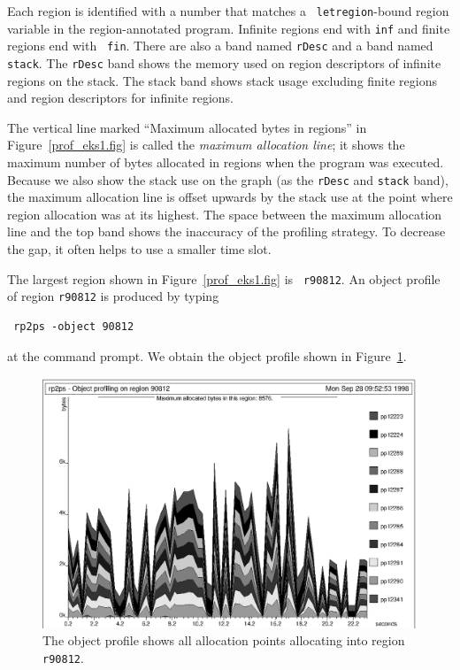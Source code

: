 \documentclass[12pt]{book}
\begin{document}
Each region is identified with a number that matches a {\tt
  letregion}-bound region variable in the region-annotated program.
Infinite regions end with {\tt inf} and finite regions end with {\tt
  fin}. There are also a band named {\tt rDesc} and a band named
{\tt stack}. The {\tt rDesc} band shows the memory used on
region descriptors of infinite regions on the stack. The stack band
shows stack usage excluding finite regions and region descriptors for
infinite regions.

The vertical line marked ``Maximum allocated bytes in regions'' in
Figure~\ref{prof_eks1.fig} is called the {\em maximum allocation
  line}; it shows the maximum number of bytes allocated in regions
when the program was executed. Because we also show the stack use on
the graph (as the {\tt rDesc} and {\tt stack} band), the maximum
allocation line is offset upwards by the stack use at the point where
region allocation was at its highest. The space between the maximum
allocation line and the top band shows the inaccuracy of the profiling
strategy. To decrease the gap, it often helps to use a smaller time
slot.

The largest region shown in Figure~\ref{prof_eks1.fig} is {\tt
  r90812}. An
%
%
object profile of region {\tt r90812} is produced by typing
\begin{verbatim}
 rp2ps -object 90812
\end{verbatim}
at the command prompt. We obtain the object profile shown in
Figure~\ref{prof_eks2.fig}.
\begin{figure}
\begin{center}
\includegraphics{prof_eks2.ps}
\end{center}
\caption{The object profile shows all allocation points allocating into region {\tt r90812}.}
\label{prof_eks2.fig}
\end{figure}
\end{document}
